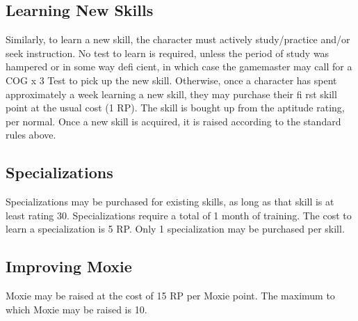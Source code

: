\subsection{Learning New Skills}
Similarly, to learn a new skill, the character must actively study/practice
and/or seek instruction. No test to learn is required, unless the period of
study was hampered or in some way defi cient, in which case the gamemaster may
call for a COG x 3 Test to pick up the new skill. Otherwise, once a character
has spent approximately a week learning a new skill, they may purchase their fi
rst skill point at the usual cost (1 RP). The skill is bought up from the
aptitude rating, per normal. Once a new skill is acquired, it is raised
according to the standard rules above.

\subsection{Specializations}
Specializations may be purchased for existing skills, as long as that skill is
at least rating 30. Specializations require a total of 1 month of training. The
cost to learn a specialization is 5 RP. Only 1 specialization may be purchased
per skill.

\subsection{Improving Moxie}
Moxie may be raised at the cost of 15 RP per Moxie point. The maximum to which
Moxie may be raised is 10.

